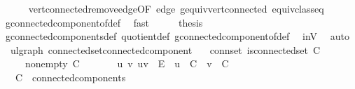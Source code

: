 \begin{isabellebody}
\ \ \ \ \isamarkupfalse%
\ vert{\isacharunderscore}{\kern0pt}connected{\isacharunderscore}{\kern0pt}remove{\isacharunderscore}{\kern0pt}edge{\isacharbrackleft}{\kern0pt}OF\ edge{\isacharbrackright}{\kern0pt}\ g{\isacharprime}{\kern0pt}{\isachardot}{\kern0pt}equiv{\isacharunderscore}{\kern0pt}vert{\isacharunderscore}{\kern0pt}connected\ equiv{\isacharunderscore}{\kern0pt}class{\isacharunderscore}{\kern0pt}eq\ \isamarkupfalse%
\ g{\isacharprime}{\kern0pt}{\isachardot}{\kern0pt}connected{\isacharunderscore}{\kern0pt}component{\isacharunderscore}{\kern0pt}of{\isacharunderscore}{\kern0pt}def\ \isamarkupfalse%
\ fast\isanewline
\ \ \isamarkupfalse%
\ \isamarkupfalse%
\ {\isacharquery}{\kern0pt}thesis\ \isamarkupfalse%
\ g{\isacharprime}{\kern0pt}{\isachardot}{\kern0pt}connected{\isacharunderscore}{\kern0pt}components{\isacharunderscore}{\kern0pt}def\ quotient{\isacharunderscore}{\kern0pt}def\ g{\isacharprime}{\kern0pt}{\isachardot}{\kern0pt}connected{\isacharunderscore}{\kern0pt}component{\isacharunderscore}{\kern0pt}of{\isacharunderscore}{\kern0pt}def\ \isamarkupfalse%
\ inV\ \isamarkupfalse%
\ auto\isanewline
{}\isamarkupfalse%
%
\endisatagproof
{\isafoldproof}%
%
\isadelimproof
\isanewline
%
\endisadelimproof
\isanewline
{}\isamarkupfalse%
\ {\isacharparenleft}{\kern0pt}\ ulgraph{\isacharparenright}{\kern0pt}\ connected{\isacharunderscore}{\kern0pt}set{\isacharunderscore}{\kern0pt}connected{\isacharunderscore}{\kern0pt}component{\isacharcolon}{\kern0pt}\isanewline
\ \ \ conn{\isacharunderscore}{\kern0pt}set{\isacharcolon}{\kern0pt}\ {\isachardoublequoteopen}is{\isacharunderscore}{\kern0pt}connected{\isacharunderscore}{\kern0pt}set\ C{\isachardoublequoteclose}\isanewline
\ \ \ \ \ non{\isacharunderscore}{\kern0pt}empty{\isacharcolon}{\kern0pt}\ {\isachardoublequoteopen}C\ {\isasymnoteq}\ {\isacharbraceleft}{\kern0pt}{\isacharbraceright}{\kern0pt}{\isachardoublequoteclose}\isanewline
\ \ \ \ \ {\isachardoublequoteopen}{\isasymAnd}u\ v{\isachardot}{\kern0pt}\ {\isacharbraceleft}{\kern0pt}u{\isacharcomma}{\kern0pt}v{\isacharbraceright}{\kern0pt}\ {\isasymin}\ E\ {\isasymLongrightarrow}\ u\ {\isasymin}\ C\ {\isasymLongrightarrow}\ v\ {\isasymin}\ C{\isachardoublequoteclose}\isanewline
\ \ \ {\isachardoublequoteopen}C\ {\isasymin}\ connected{\isacharunderscore}{\kern0pt}components{\isachardoublequoteclose}\isanewline

\end{isabellebody}
